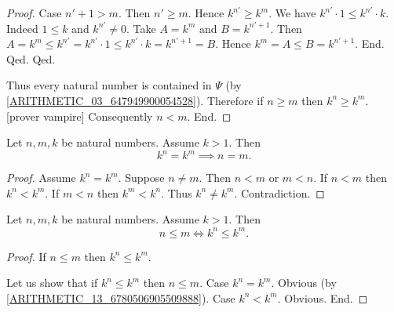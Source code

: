 \documentclass[10pt]{article}
\begin{document}
\begin{forthel}
\begin{proof}
            Case $n' + 1 > m$.
              Then $n' \geq m$.
              Hence $k^{n'} \geq k^{m}$.
              We have $k^{n'} \cdot 1 \leq k^{n'} \cdot k$.
              Indeed $1 \leq k$ and $k^{n'} \neq 0$.
              Take $A = k^{m}$ and $B = k^{n' + 1}$. %
              Then $A
                = k^{m}
                \leq k^{n'}
                = k^{n'} \cdot 1
                \leq k^{n'} \cdot k
                = k^{n' + 1}
                = B$.
              Hence $k^{m} = A \leq B = k^{n' + 1}$.
            End.
          Qed.
        Qed.

        Thus every natural number is contained in $\Psi$ (by \cref{ARITHMETIC_03_647949900054528}).
        Therefore if $n \geq m$ then $k^{n} \geq k^{m}$.
        [prover vampire]
        Consequently $n < m$.
      End.
    \end{proof}
  \end{forthel}

  \begin{forthel}
    \begin{corollary}
      Let $n, m, k$ be natural numbers.
      Assume $k > 1$.
      Then \[ k^{n} = k^{m} \implies n = m. \]
    \end{corollary}
    \begin{proof}
      Assume $k^{n} = k^{m}$.
      Suppose $n \neq m$.
      Then $n < m$ or $m < n$.
      If $n < m$ then $k^{n} < k^{m}$.
      If $m < n$ then $k^{m} < k^{n}$.
      Thus $k^{n} \neq k^{m}$.
      Contradiction.
    \end{proof}
  \end{forthel}

  \begin{forthel}
    \begin{corollary}
      Let $n, m, k$ be natural numbers.
      Assume $k > 1$.
      Then \[ n \leq m \iff k^{n} \leq k^{m}. \]
    \end{corollary}
    \begin{proof}
      If $n \leq m$ then $k^{n} \leq k^{m}$.

      Let us show that if $k^{n} \leq k^{m}$ then $n \leq m$.
        Case $k^{n} = k^{m}$. Obvious (by \cref{ARITHMETIC_13_6780506905509888}).
        Case $k^{n} < k^{m}$. Obvious.
      End.
    \end{proof}
  \end{forthel}
\end{document}
